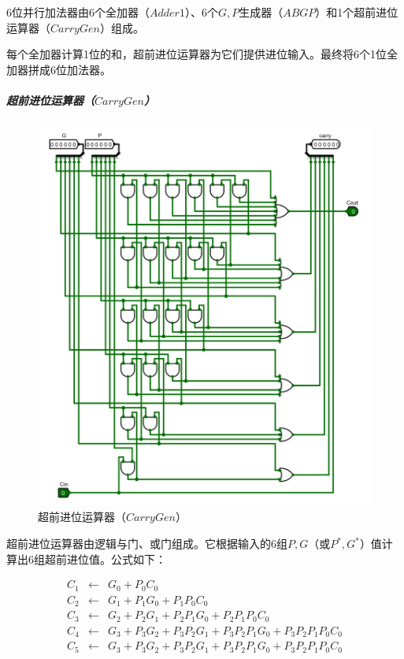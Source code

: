 \documentclass[main.tex]{subfiles}
\begin{document}
6位并行加法器由6个全加器（$Adder1$）、6个$G, P$生成器（$ABGP$）和1个超前进位运算器（$CarryGen$）组成。

每个全加器计算1位的和，超前进位运算器为它们提供进位输入。最终将6个1位全加器拼成6位加法器。



\subparagraph{超前进位运算器（$CarryGen$）} 

\begin{figure}[H]
\centering
\includegraphics[width=\textwidth]{images/CarryGen-circuit.png}
\caption{超前进位运算器（$CarryGen$）}
\end{figure}

超前进位运算器由逻辑与门、或门组成。它根据输入的6组$P, G$（或$P^*, G^*$）值计算出6组超前进位值。公式如下：

$$
\begin{array}{rcl}
C_1 &\leftarrow& G_0+P_0C_0 \\
C_2 &\leftarrow& G_1+P_1G_0+P_1P_0C_0 \\
C_3 &\leftarrow& G_2+P_2G_1+P_2P_1G_0+P_2P_1P_0C_0 \\
C_4 &\leftarrow& G_3+P_3G_2+P_3P_2G_1+P_3P_2P_1G_0+P_3P_2P_1P_0C_0 \\
C_5 &\leftarrow& G_3+P_3G_2+P_3P_2G_1+P_3P_2P_1G_0+P_3P_2P_1P_0C_0 \\
\end{array}
$$
\end{document}
